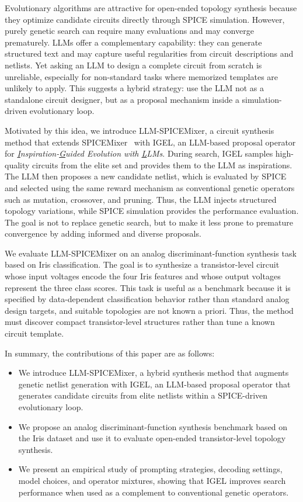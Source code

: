 \documentclass[sigconf,pbalance]{acmart_modified}
\newcommand{\llmspm}{LLM-SPICE\-Mixer}
\newcommand{\spm}{SPICE\-Mixer}
\begin{document}
Evolutionary algorithms are attractive for open-ended topology synthesis because they optimize candidate circuits directly through SPICE simulation. However, purely genetic search can require many evaluations and may converge prematurely. LLMs offer a complementary capability: they can generate structured text and may capture useful regularities from circuit descriptions and netlists. Yet asking an LLM to design a complete circuit from scratch is unreliable, especially for non-standard tasks where memorized templates are unlikely to apply. This suggests a hybrid strategy: use the LLM not as a standalone circuit designer, but as a proposal mechanism inside a simulation-driven evolutionary loop.

Motivated by this idea, we introduce \llmspm{}, a circuit synthesis method that extends \spm{}~\cite{uhlich2025spicemixer} with IGEL, an LLM-based proposal operator for \emph{\underline{I}nspiration-\underline{G}uided Evolution with \underline{L}LMs}. During search, IGEL samples high-quality circuits from the elite set and provides them to the LLM as inspirations. The LLM then proposes a new candidate netlist, which is evaluated by SPICE and selected using the same reward mechanism as conventional genetic operators such as mutation, crossover, and pruning. Thus, the LLM injects structured topology variations, while SPICE simulation provides the performance evaluation. The goal is not to replace genetic search, but to make it less prone to premature convergence by adding informed and diverse proposals.

We evaluate \llmspm{} on an analog discriminant-function synthesis task based on Iris classification. The goal is to synthesize a transistor-level circuit whose input voltages encode the four Iris features and whose output voltages represent the three class scores. This task is useful as a benchmark because it is specified by data-dependent classification behavior rather than standard analog design targets, and suitable topologies are not known a priori. Thus, the method must discover compact transistor-level structures rather than tune a known circuit template.

\noindent In summary, the contributions of this paper are as follows:
\begin{itemize}[noitemsep, topsep=0pt, leftmargin=*]
    \item We introduce \llmspm{}, a hybrid synthesis method that augments genetic netlist generation with IGEL, an LLM-based proposal operator that generates candidate circuits from elite netlists within a SPICE-driven evolutionary loop.
    \item We propose an analog discriminant-function synthesis benchmark based on the Iris dataset and use it to evaluate open-ended transistor-level topology synthesis.
    \item We present an empirical study of prompting strategies, decoding settings, model choices, and operator mixtures, showing that IGEL improves search performance when used as a complement to conventional genetic operators.
\end{itemize}
\end{document}
